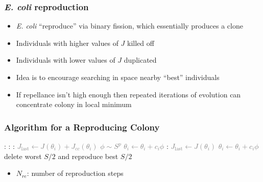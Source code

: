 \documentclass{beamer}
\begin{document}
\begin{frame}
\frametitle{\textit{E. coli} reproduction}
\begin{itemize}
  \item<1-> \textit{E. coli} ``reproduce'' via binary fission, which essentially produces a clone
  \item<2-> Individuals with higher values of $J$ killed off
  \item<3-> Individuals with lower values of $J$ duplicated
  \item<4-> Idea is to encourage searching in space nearby ``best'' individuals
  \item<5-> \alert{If repellance isn't high enough then repeated iterations of evolution can concentrate colony in local minimum}
\end{itemize}
\end{frame}

\begin{frame}
\frametitle{Algorithm for a Reproducing Colony}
\begin{algorithmic}[1]
:
  \For {\textcolor{gray}{$j \gets 1 \dots N_c $}}:
    \For {\textcolor{gray}{$i \gets 1 \dots S$}}:
      \State \textcolor{gray}{$J_\text{last} \gets J(\theta_i) + J_{cc}(\theta_i)$}
      \State \textcolor{gray}{$\phi \sim S^p$}
      \State \textcolor{gray}{$\theta_i \gets \theta_i + c_i \phi$}
      :
        \State \textcolor{gray}{$J_\text{last} \gets J(\theta_i)$}
        \State \textcolor{gray}{$\theta_i \gets \theta_i + c_i \phi$}
      \EndWhile
    \EndFor
  \EndFor
  \State delete worst $S/2$ and reproduce best $S/2$
\EndFor
\end{algorithmic}
\begin{itemize}
  \item $N_{re}$: number of reproduction steps
\end{itemize}
\end{frame}
\end{document}
